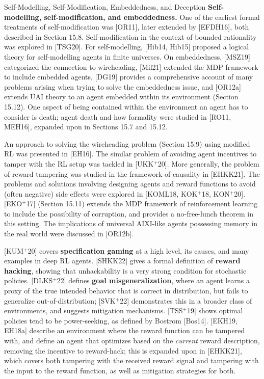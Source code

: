 \documentclass[aspectratio=169,10pt]{beamer}
\begin{document}
\begin{frame}[allowframebreaks]{Self-Modelling, Self-Modification, Embeddedness, and Deception}
  \textbf{Self-modelling, self-modification, and embeddedness.} One of
  the earliest formal treatments of self-modification was [OR11], later
  extended by [EFDH16], both described in Section 15.8. Self-modification
  in the context of bounded rationality was explored in [TSG20]. For
  self-modelling, [Hib14, Hib15] proposed a logical theory for
  self-modelling agents in finite universes. On embeddedness, [MSZ19]
  categorized the connection to wireheading, [Mil21] extended the MDP
  framework to include embedded agents, [DG19] provides a comprehensive
  account of many problems arising when trying to solve the embeddedness
  issue, and [OR12a] extends UAI theory to an agent embedded within its
  environment (Section 15.12). One aspect of being contained within the
  environment an agent has to consider is death; agent death and how
  formality were studied in [RO11, MEH16], expanded upon in Sections 15.7
  and 15.12.

  \framebreak

  An approach to solving the wireheading problem (Section 15.9) using
  modified RL was presented in [EH16]. The similar problem of avoiding
  agent incentives to tamper with the RL setup was tackled in
  [UKK$^+$20]. More generally, the problem of reward tampering was
  studied in the framework of causality in [EHKK21]. The problems and
  solutions involving designing agents and reward functions to avoid
  (often negative) side effects were explored in [KOML18, KOK$^+$18,
  KON$^+$20]. [EKO$^+$17] (Section 15.11) extends the MDP framework of
  reinforcement learning to include the possibility of corruption, and
  provides a no-free-lunch theorem in this setting. The implications of
  universal AIXI-like agents possessing memory in the real world were
  discussed in [OR12b].

  \vspace{0.4em}
  [KUM$^+$20] covers \textbf{specification gaming} at a high level, its
  causes, and many examples in deep RL agents. [SHKK22] gives a formal
  definition of \textbf{reward hacking}, showing that unhackability is a
  very strong condition for stochastic policies. [DLKS$^+$22] defines
  \textbf{goal misgeneralization}, where an agent learns a proxy of the
  true intended behavior that is correct in distribution, but fails to
  generalize out-of-distribution; [SVK$^+$22] demonstrates this in a
  broader class of environments, and suggests mitigation mechanisms.
  [TSS$^+$19] shows optimal policies tend to be power-seeking, as defined
  by Bostrom [Bos14]. [EKH19, EH18a] describe an environment where the
  reward function can be tampered with, and define an agent that
  optimizes based on the \emph{current} reward description, removing the
  incentive to reward-hack; this is expanded upon in [EHKK21], which
  covers both tampering with the received reward signal and tampering
  with the input to the reward function, as well as mitigation strategies
  for both.


\end{frame}
\end{document}

